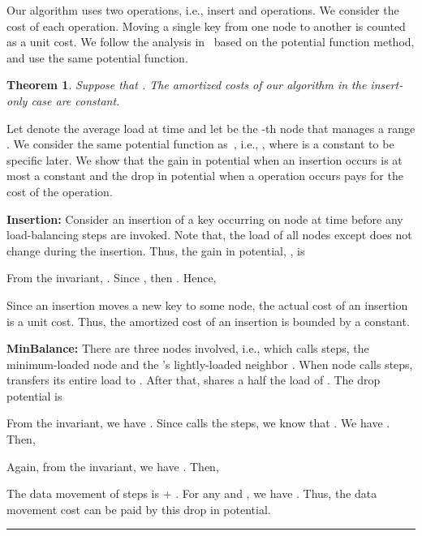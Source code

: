 \documentclass[a4paper]{article}
\newtheorem{theorem}{Theorem}
\newenvironment{proof}{{\bf Proof:}}{\hfill\rule{1.5mm}{3mm}\vspace{0.1in}}
\begin{document}
Our algorithm uses two operations, i.e., insert and {\minbalance} operations.
 We consider the cost of each operation. Moving a single
key from one node to another is counted as a unit cost.  We follow the
analysis in~\cite{GanesanBGM04-vldb} based on the potential function
method, and use the same potential function.

\begin{theorem}\label{thm:amortized_cost_insertonly}
   Suppose that . The amortized costs of our algorithm in the insert-only case are
  constant.
\end{theorem}

\begin{proof}
  Let  denote the average load at time  and let  be
  the -th node that manages a range . We consider the
  same potential function as~\cite{GanesanBGM04-vldb}, i.e., , where  is a
  constant to be specific later. We show that the gain in potential
  when an insertion occurs is at most a constant and the drop in
  potential when a {\minbalance} operation occurs pays for the cost
  of the operation.

  \textbf{Insertion:} Consider an insertion of a key occurring on node
   at time  before any load-balancing steps are invoked. Note
  that, the load of all nodes except  does not change during the
  insertion. Thus, the gain in potential, , is

  	

  From the invariant,  . Since 
  , then
  . Hence, 
  
  	

  Since an insertion moves a new key to some node, the actual cost of an
  insertion is a unit cost. Thus, the amortized cost of an insertion is
  bounded by a constant.

  \textbf{MinBalance:} There are three nodes involved, i.e.,
   which calls {\minbalance} steps, the minimum-loaded node 
  and the 's lightly-loaded neighbor . When node  calls
  {\minbalance} steps,  transfers its entire load to . After
  that,  shares a half the load of .  The drop potential is

  	

  From the invariant, we have .
  Since  calls the  {\minbalance} steps, we know that
  . We have  .  Then, 

  

  Again, from the invariant, we have .  Then,

  

  The data movement of {\minbalance} steps is + .  For any  and , we
  have .  Thus, the data movement cost can be
  paid by this drop in potential.
\end{proof}
\end{document}
